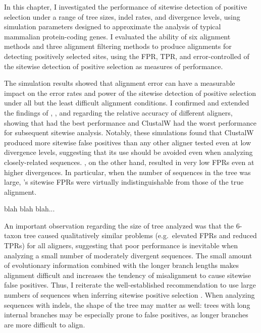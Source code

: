 In this chapter, I investigated the performance of sitewise detection
of positive selection under a range of tree sizes, indel rates, and
divergence levels, using simulation parameters designed to approximate
the analysis of typical mammalian protein-coding genes. I evaluated
the ability of six alignment methods and three alignment filtering
methods to produce alignments for detecting positively selected sites,
using the FPR, TPR, and error-controlled \tpr of the sitewise
detection of positive selection as measures of performance.

The simulation results showed that alignment error can have a
measurable impact on the error rates and power of the sitewise
detection of positive selection under all but the least difficult
alignment conditions. I confirmed and extended the findings of
\citet{Fletcher2010}, \citet{MarkovaRaina2011}, and
\citet{Privman2011Improving} regarding the relative accuracy of
different aligners, showing that \prankc had the best performance and
ClustalW had the worst performance for subsequent sitewise
analysis. Notably, these simulations found that ClustalW produced more
sitewise false positives than any other aligner tested even at low
divergence levels, suggesting that its use should be avoided even when
analyzing closely-related sequences. \prankc, on the other hand,
resulted in very low FPRs even at higher divergences. In particular,
when the number of sequences in the tree was large, \prankc{}'s
sitewise FPRs were virtually indistinguishable from those of the true
alignment.

blah blah blah...

An important observation regarding the size of tree analyzed was that
the 6-taxon tree caused qualitatively similar problems (e.g.\,
elevated FPRs and reduced TPRs) for all aligners, suggesting that poor
performance is inevitable when analyzing a small number of moderately
divergent sequences. The small amount of evolutionary information
combined with the longer branch lengths makes alignment difficult and
increases the tendency of misalignment to cause sitewise false
positives. Thus, I reiterate the well-established recommendation to
use large numbers of sequences when inferring sitewise positive
selection \citep{Anisimova2001,Anisimova2002}. When analyzing
sequences with indels, the shape of the tree may matter as well: trees
with long internal branches may be especially prone to false
positives, as longer branches are more difficult to align.

